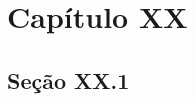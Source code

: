 \chapter{\hspace*{3pt} Capítulo XX}\label{chap:capitulo2}


\section{\hspace*{3pt} Seção XX.1}\label{sec:secaoxx.1}